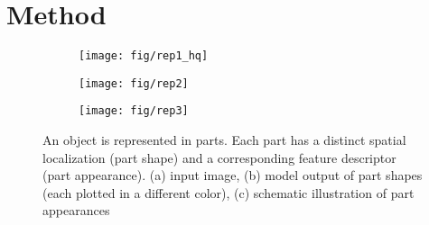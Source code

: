 
\section{Method}


\begin{figure}[!h]
\begin{subfigure}{0.33\textwidth}
\centering
\texttt{[image: fig/rep1\_hq]}\caption{}
\label{fig:rep1}
\end{subfigure}
\begin{subfigure}{0.33\textwidth}
\centering
\texttt{[image: fig/rep2]}\caption{}
\label{fig:rep2}
\end{subfigure}
\begin{subfigure}{0.33\textwidth}
\centering
\texttt{[image: fig/rep3]}\caption{}
\label{fig:rep3}
\end{subfigure}
\caption{ \small{An object is represented in parts. Each part has a distinct spatial localization (part shape) and a corresponding feature descriptor (part appearance). (a) input image, (b) model output of part shapes (each plotted in a different color), (c) schematic illustration of part appearances}}
\label{fig:representation}
\end{figure}

